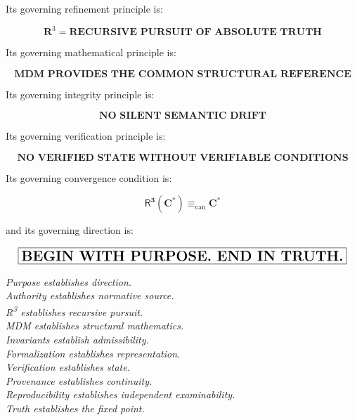 \documentclass[11pt]{article}
\newcommand{\Rthree}{\ensuremath{\mathsf{R}^{3}}}
\begin{document}
Its governing refinement principle is:

\[
\boxed{
\textbf{
R}^{3}
=
\textbf{RECURSIVE PURSUIT OF ABSOLUTE TRUTH}
}
\]

Its governing mathematical principle is:

\[
\boxed{
\textbf{
MDM PROVIDES THE COMMON STRUCTURAL REFERENCE
}
}
\]

Its governing integrity principle is:

\[
\boxed{
\textbf{
NO SILENT SEMANTIC DRIFT
}
}
\]

Its governing verification principle is:

\[
\boxed{
\textbf{
NO VERIFIED STATE WITHOUT VERIFIABLE CONDITIONS
}
}
\]

Its governing convergence condition is:

\[
\boxed{
\boldsymbol{
\Rthree(C^{*})
\equiv_{\mathrm{can}}
C^{*}
}
}
\]

and its governing direction is:

\[
\boxed{
\text{\Large\textbf{BEGIN WITH PURPOSE. END IN TRUTH.}}
}
\]

\vfill

\begin{center}
\textit{
Purpose establishes direction.\\
Authority establishes normative source.\\
R\textsuperscript{3} establishes recursive pursuit.\\
MDM establishes structural mathematics.\\
Invariants establish admissibility.\\
Formalization establishes representation.\\
Verification establishes state.\\
Provenance establishes continuity.\\
Reproducibility establishes independent examinability.\\
Truth establishes the fixed point.
}
\end{center}
\end{document}
